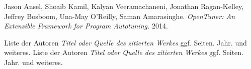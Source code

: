 \documentclass[a4paper,11pt]{scrartcl}
\begin{document}
\begin{thebibliography}{9}
   
  
     Jason Ansel, Shoaib Kamil, Kalyan Veeramachaneni, Jonathan Ragan-Kelley, Jeffrey Bosboom, Una-May O'Reilly, Saman Amarasinghe. \emph{OpenTuner: An Extensible Framework for Program Autotuning.}
    2014.
   
 Liste der Autoren \emph{Titel oder Quelle des zitierten Werkes} ggf. Seiten.
    Jahr. und weiteres.
 Liste der Autoren \emph{Titel oder Quelle des zitierten Werkes} ggf. Seiten.
    Jahr. und weiteres.

\end{thebibliography}


\end{document}
